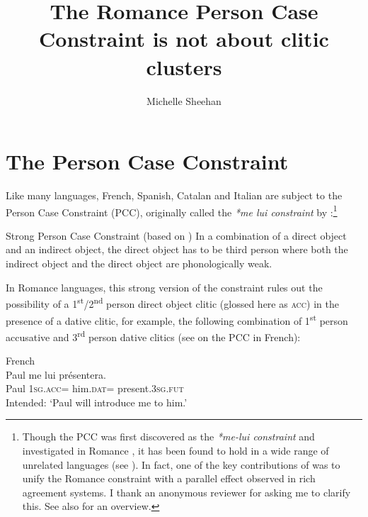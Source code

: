 \documentclass[output=paper,colorlinks,citecolor=brown,nonflat]{langsci/langscibook}
\author{Michelle Sheehan\affiliation{Anglia Ruskin University}}
\title{The Romance Person Case Constraint is not about clitic clusters}
\begin{document}
\maketitle
\newpage
\section{The Person Case Constraint}\label{sec:sheehan:1}

Like many languages, French, Spanish, Catalan and Italian are subject to the Person Case Constraint (PCC), originally called the \textit{*me lui constraint} by \citet{Perlmutter1971}:\footnote{Though the PCC was first discovered as the \textit{*me-lui constraint} and investigated in Romance \citep{Perlmutter1971}, it has been found to hold in a wide range of unrelated languages (see \citealt{Bonet1991, Albizu1997, Rezac2008, Haspelmath2004, AdgerHarbour2007}). In fact, one of the key contributions of \citet{Bonet1991} was to unify the Romance constraint with a parallel effect observed in rich agreement systems. I thank an anonymous reviewer for asking me to clarify this. See also \citet{Bonet2007} for an overview.}

\ea%
    \label{ex:sheehan:1}
    Strong Person Case Constraint (based on \citealt[181--182]{Bonet1991})
    \ea\label{ex:sheehan:1a}
    In a combination of a direct object and an indirect object, the direct object has to be third person
    \ex\label{ex:sheehan:1b}
    where both the indirect object and the direct object are phonologically weak.
    \z
\z

In Romance languages, this strong version of the constraint rules out the possibility of a 1\textsuperscript{st}/2\textsuperscript{nd} person direct object clitic (glossed here as \textsc{acc}) in the presence of a dative clitic, for example, the following combination of 1\textsuperscript{st} person accusative and 3\textsuperscript{rd} person dative clitics (see \citealt{Perlmutter1971, Kayne1975, Postal1981} on the PCC in French):

\ea%
    \label{ex:sheehan:2}
    French \citep[173]{Kayne1975}\\
    \gll    *Paul   me       lui       présentera.\\
            Paul   \textsc{1sg}.\textsc{acc}=   him.\textsc{dat=} present.\textsc{3sg.fut}\\
    \glt    Intended: ‘Paul will introduce me to him.’
\z
\end{document}

